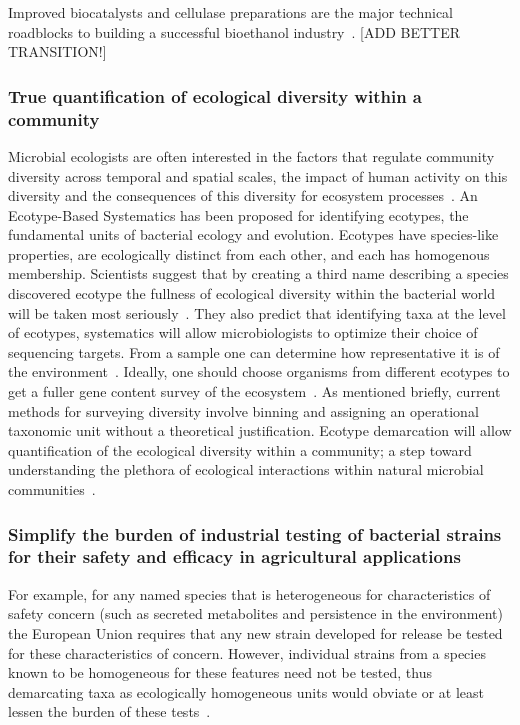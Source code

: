 Improved biocatalysts and cellulase preparations are the major technical roadblocks to building a successful bioethanol industry~\cite{dien2003bacteria}. [ADD BETTER TRANSITION!]

\subsubsection*{True quantification of ecological diversity within a community}
Microbial ecologists are often interested in the factors that regulate community diversity across temporal and spatial scales, the impact of human activity on this diversity and the consequences of this diversity for ecosystem processes~\cite{bohannan2003new}.
An Ecotype-Based Systematics has been proposed for identifying ecotypes, the fundamental units of bacterial ecology and evolution.
Ecotypes have species-like properties, are ecologically distinct from each other, and each has homogenous membership.
Scientists suggest that by creating a third name describing a species discovered ecotype the fullness of ecological diversity within the bacterial world will be taken most seriously~\cite{cohan2007systematics}.
They also predict that identifying taxa at the level of ecotypes, systematics will allow microbiologists to optimize their choice of sequencing targets.
From a sample one can determine how representative it is of the environment~\cite{bohannan2003new}.
Ideally, one should choose organisms from different ecotypes to get a fuller gene content survey of the ecosystem~\cite{cohan2007systematics}.
As mentioned briefly, current methods for surveying diversity involve binning and assigning an operational taxonomic unit without a theoretical justification.
Ecotype demarcation will allow quantification of the ecological diversity within a community; a step toward understanding the plethora of ecological interactions within natural microbial communities~\cite{cohan2007systematics}.

\subsubsection*{Simplify the burden of industrial testing of bacterial strains for their safety and efficacy in agricultural applications}
For example, for any named species that is heterogeneous for characteristics of safety concern (such as secreted metabolites and persistence in the environment) the European Union requires that any new strain developed for release be tested for these characteristics of concern.
However, individual strains from a species known to be homogeneous for these features need not be tested, thus demarcating taxa as ecologically homogeneous units would obviate or at least lessen the burden of these tests~\cite{cohan2007systematics}.


